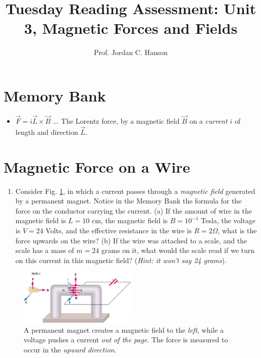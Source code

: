 \documentclass{article}
\begin{document}
\title{Tuesday Reading Assessment: Unit 3, Magnetic Forces and Fields}
\author{Prof. Jordan C. Hanson}

\maketitle

\section{Memory Bank}

\begin{itemize}
\item $\vec{F} = i\vec{L} \times \vec{B}$ ... The Lorentz force, by a magnetic field $\vec{B}$ on a \textit{current} $i$ of length and direction $\vec{L}$.
\end{itemize}

\section{Magnetic Force on a Wire}

\begin{enumerate}
\item Consider Fig. \ref{fig:1}, in which a current passes through a \textit{magnetic field} generated by a permanent magnet.  Notice in the Memory Bank the formula for the force on the conductor carrying the current.  (a) If the amount of wire in the magnetic field is $L = 10$ cm, the magnetic field is $B = 10^{-1}$ Tesla, the voltage is $V = 24$ Volts, and the effective resistance in the wire is $R = 2\Omega$, what is the force upwards on the wire? (b)  If the wire was attached to a scale, and the scale has a mass of $m = 24$ grams on it, what would the scale read if we turn on this current in this magnetic field?  (\textit{Hint: it won't say 24 grams}).
\end{enumerate}

\begin{figure}
\centering
\includegraphics[width=0.5\textwidth]{figures/force.jpeg}
\caption{\label{fig:1} A permanent magnet creates a magnetic field to the \textit{left}, while a voltage pushes a current \textit{out of the page}.  The force is measured to occur in the \textit{upward direction}.}
\end{figure}
\end{document}
